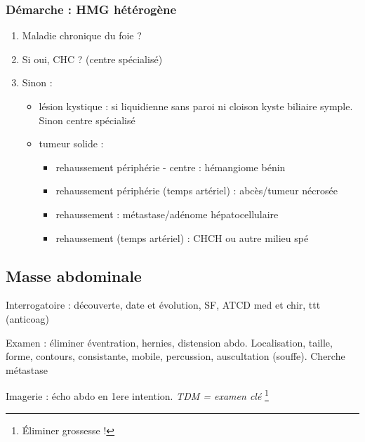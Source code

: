 \documentclass[11pt]{article}
\begin{document}
\subsubsection{Démarche : HMG hétérogène}
\label{sec:orgfe293df}
\begin{enumerate}
\item Maladie chronique du foie ?
\item Si oui, CHC ? (centre spécialisé)
\item Sinon : 
\begin{itemize}
\item lésion kystique : si liquidienne sans paroi ni cloison \thus kyste biliaire
symple. Sinon centre spécialisé
\item tumeur solide :
\begin{itemize}
\item rehaussement périphérie - centre : hémangiome bénin
\item rehaussement périphérie (temps artériel) : abcès/tumeur nécrosée
\item rehaussement : métastase/adénome hépatocellulaire
\item rehaussement (temps artériel) :  CHCH ou autre \thus milieu spé
\end{itemize}
\end{itemize}
\end{enumerate}

\subsection{Masse abdominale}
\label{sec:org86a8b16}
Interrogatoire : découverte, date et évolution, SF, ATCD med et chir, ttt
(anticoag)

Examen : éliminer éventration, hernies, distension abdo. Localisation, taille,
forme, contours, consistante, mobile, percussion, auscultation (souffe).
Cherche métastase

Imagerie : écho abdo en 1ere intention. \emph{TDM = examen clé} \footnote{Éliminer grossesse !}
\end{document}
